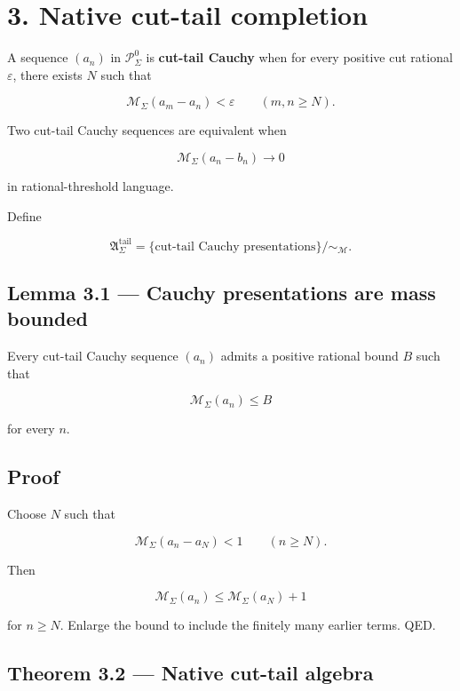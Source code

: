 \hypertarget{native-cut-tail-completion}{%
\section{3. Native cut-tail completion}\label{native-cut-tail-completion}}

A sequence \((a_n)\) in \(\mathscr P_\Sigma^0\) is \textbf{cut-tail Cauchy} when for
every positive cut rational \(\varepsilon\), there exists \(N\) such that

\[
\mathcal M_\Sigma(a_m-a_n)<\varepsilon
\qquad(m,n\ge N).
\tag{3.1}
\]

Two cut-tail Cauchy sequences are equivalent when

\[
\mathcal M_\Sigma(a_n-b_n)\longrightarrow0
\tag{3.2}
\]

in rational-threshold language.

Define

\[
\boxed{
\mathfrak A_\Sigma^{\mathrm{tail}}
=
\{\text{cut-tail Cauchy presentations}\}/\sim_{\mathcal M}.
}
\tag{3.3}
\]

\hypertarget{lemma-3.1-cauchy-presentations-are-mass-bounded}{%
\subsection{Lemma 3.1 --- Cauchy presentations are mass bounded}\label{lemma-3.1-cauchy-presentations-are-mass-bounded}}

Every cut-tail Cauchy sequence \((a_n)\) admits a positive rational bound
\(B\) such that

\[
\mathcal M_\Sigma(a_n)\le B
\]

for every \(n\).

\hypertarget{proof-2}{%
\subsection{Proof}\label{proof-2}}

Choose \(N\) such that

\[
\mathcal M_\Sigma(a_n-a_N)<1
\qquad(n\ge N).
\]

Then

\[
\mathcal M_\Sigma(a_n)
\le
\mathcal M_\Sigma(a_N)+1
\]

for \(n\ge N\). Enlarge the bound to include the finitely many earlier terms.
QED.

\hypertarget{theorem-3.2-native-cut-tail-algebra}{%
\subsection{Theorem 3.2 --- Native cut-tail algebra}\label{theorem-3.2-native-cut-tail-algebra}}

